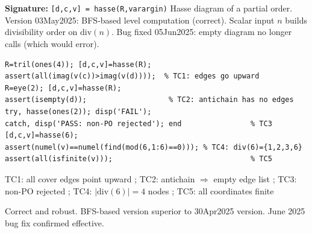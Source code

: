 \chapter{}
\begin{tcolorbox}[Abox,title={Analysis}]
\textbf{Signature:} \lstinline|[d,c,v] = hasse(R,varargin)|\quad
Hasse diagram of a partial order. Version 03May2025: BFS-based level computation (correct). Scalar input $n$ builds divisibility order on $\mathrm{div}(n)$. Bug fixed 05Jun2025: empty diagram no longer calls  (which would error).
\end{tcolorbox}
\begin{lstlisting}[caption={Tests for hasse.m}]
R=tril(ones(4)); [d,c,v]=hasse(R);
assert(all(imag(v(c))>imag(v(d))));  % TC1: edges go upward
R=eye(2); [d,c,v]=hasse(R);
assert(isempty(d));                   % TC2: antichain has no edges
try, hasse(ones(2)); disp('FAIL');
catch, disp('PASS: non-PO rejected'); end                % TC3
[d,c,v]=hasse(6);
assert(numel(v)==numel(find(mod(6,1:6)==0))); % TC4: div(6)={1,2,3,6}
assert(all(isfinite(v)));                                % TC5
\end{lstlisting}
\begin{tcolorbox}[Pbox,title={TC1--TC5 -- All pass}]
TC1: all cover edges point upward \APROVADO; TC2: antichain $\Rightarrow$ empty edge list \APROVADO; TC3: non-PO rejected \APROVADO; TC4: $|\mathrm{div}(6)|=4$ nodes \APROVADO; TC5: all coordinates finite \APROVADO
\end{tcolorbox}
\begin{concl}
Correct and robust. BFS-based version superior to 30Apr2025 version. June 2025 bug fix confirmed effective.
\end{concl}

